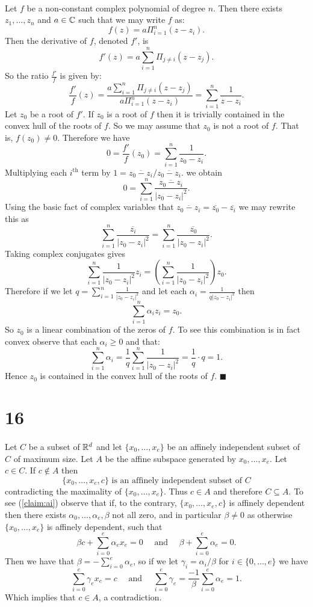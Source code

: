 \documentclass[letterpaper,12pt,oneside,onecolumn]{article}
\begin{document}
\paragraph{}
Let $f$ be a non-constant complex polynomial of degree $n$. Then there exists $z_1, \dots, z_n$ and $a \in \mathbb{C}$ such that we may write $f$ as:
$$f(z) = a\Pi_{i=1}^n(z-z_i).$$
Then the derivative of $f$, denoted $f'$, is
$$f'(z) = a\sum_{i=1}^n \Pi_{j\neq i} (z-z_j). $$
So the ratio $\frac{f'}{f}$ is given by:
$$ \frac{f'}{f}(z) = \frac{a\sum_{i=1}^n \Pi_{j\neq i} (z-z_j)}{a\Pi_{i=1}^n(z-z_i)} = \sum_{i=1}^n \frac{1}{z-z_i}.$$
Let $z_0$ be a root of $f'$. If $z_0$ is a root of $f$ then it is trivially contained in the convex hull of the roots of $f$. So we may assume that $z_0$ is not a root of $f$. That is, $f(z_0) \neq 0$. Therefore we have
$$ 0 = \frac{f'}{f}(z_0) = \sum_{i=1}^n\frac{1}{z_0-z_i}.$$
Multiplying each $i^\text{th}$ term by $1 = \overline{z_0-z_i}/\overline{z_0-z_i}$. we obtain
$$ 0 = \sum_{i=1}^n\frac{\overline{z_0 - z_i}}{|z_0-z_i|^2}.$$
Using the basic fact of complex variables that $\overline{z_0-z_i} = \overline{z_0}-\overline{z_i}$ we may rewrite this as
$$\sum_{i=1}^n \frac{\overline{z_i}}{|z_0-z_i|^2} = \sum_{i=1}^n\frac{\overline{z_0}}{|z_0-z_i|^2}.$$
Taking complex conjugates gives
$$\sum_{i=1}^n \frac{1}{|z_0-z_i|^2}z_i = (\sum_{i=1}^n \frac{1}{|z_0-z_i|^2}) z_0.$$
Therefore if we let $q = \sum_{i=1}^n \frac{1}{|z_0-z_i|^2}$ and let each $\alpha_i = \frac{1}{q|z_0-z_i|^2}$ then
$$ \sum_{i=1}^n \alpha_i z_i = z_0.$$
So $z_0$ is a linear combination of the zeros of $f$. To see this combination is in fact convex observe that each $\alpha_i \geq 0$ and that:
$$\sum_{i=1}^n \alpha_i = \frac{1}{q} \sum_{i=1}^n \frac{1}{|z_0 - z_i|^2} = \frac{1}{q}\cdot q = 1.$$
Hence $z_0$ is contained in the convex hull of the roots of $f$. $\blacksquare$
\section*{16}
\paragraph{}
Let $C$ be a subset of $\mathbb{R}^d$ and let $\{x_0, \dots, x_e\}$ be an affinely independent subset of $C$ of maximum size. Let $A$ be the affine subspace generated by $x_0, \dots, x_e$. Let $c \in C$. If $c \not\in A$ then \begin{equation}\{x_0, \dots, x_e, c\}\text{ is an affinely independent subset of $C$}\label{claim:ai}\end{equation} contradicting the maximality of $\{x_0, \dots, x_e\}$. Thus $c \in A$ and therefore $C \subseteq A$. To see (\ref{claim:ai}) observe that if, to the contrary, $\{x_0, \dots, x_e,c\}$ is affinely dependent then there exists $\alpha_0, \dots, \alpha_e, \beta$ not all zero, and in particular $\beta \neq 0$ as otherwise $\{x_0, \dots, x_e\}$ is affinely dependent, such that $$\beta c + \sum_{i=0}^e \alpha_e x_e = 0 \quad \text{ and } \quad \beta + \sum_{i=0}^e \alpha_e = 0.$$
Then we have that $\beta = -\sum_{i=0}^e \alpha_e$, so if we let $\gamma_i = \alpha_i/\beta$ for $i \in \{0,\dots,e\}$ we have
$$\sum_{i=0}^e \gamma_e x_e = c \quad \text{ and } \quad \sum_{i=0}^e \gamma_e = \frac{-1}{\beta}\sum_{i=0}^e \alpha_e = 1.$$
Which implies that $c \in A$, a contradiction.
\end{document}
